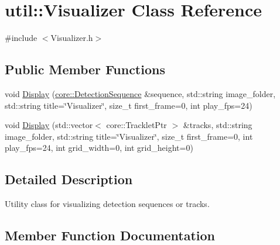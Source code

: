 \hypertarget{classutil_1_1Visualizer}{}\section{util\+:\+:Visualizer Class Reference}
\label{classutil_1_1Visualizer}


{\ttfamily \#include $<$Visualizer.\+h$>$}

\subsection*{Public Member Functions}
\begin{DoxyCompactItemize}
\item 
void \hyperlink{classutil_1_1Visualizer_a113aa30dbc168041e1ab99d81318e64d}{Display} (\hyperlink{classcore_1_1DetectionSequence}{core\+::\+Detection\+Sequence} \&sequence, std\+::string image\+\_\+folder, std\+::string title=\char`\"{}Visualizer\char`\"{}, size\+\_\+t first\+\_\+frame=0, int play\+\_\+fps=24)
\item 
void \hyperlink{classutil_1_1Visualizer_a3615ab1ebb3dc27ad83ea77521d13884}{Display} (std\+::vector$<$ core\+::\+Tracklet\+Ptr $>$ \&tracks, std\+::string image\+\_\+folder, std\+::string title=\char`\"{}Visualizer\char`\"{}, size\+\_\+t first\+\_\+frame=0, int play\+\_\+fps=24, int grid\+\_\+width=0, int grid\+\_\+height=0)
\end{DoxyCompactItemize}


\subsection{Detailed Description}
Utility class for visualizing detection sequences or tracks. 

\subsection{Member Function Documentation}
